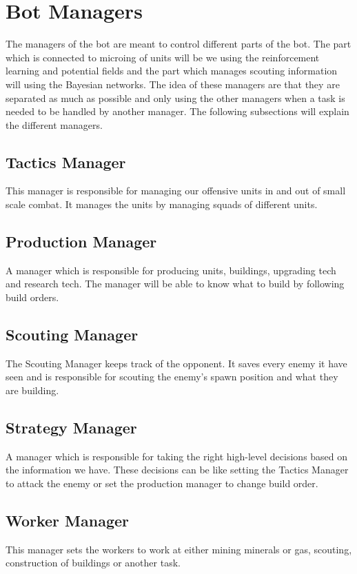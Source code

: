 \section{Bot Managers}
	\label{design::managers}
	The managers of the bot are meant to control different parts of the bot. The part which is connected to microing of units will be we using the 
	reinforcement learning and potential fields and the part which manages scouting information will using the Bayesian networks. 
	The idea of these managers are that they are separated as much as possible and only using the other managers when a task is needed to be handled 
	by another manager. The following subsections will explain the different managers.
	
	\subsection*{Tactics Manager}
		This manager is responsible for managing our offensive units in and out of small scale combat. It manages the units by managing squads of different 
		units.
	\subsection*{Production Manager}
		A manager which is responsible for producing units, buildings, upgrading tech and research tech. The manager will be able to 
		know what to build by following build orders.
	\subsection*{Scouting Manager}
		The Scouting Manager keeps track of the opponent. It saves every enemy it have seen and is responsible for scouting the enemy's spawn position and 
		what they are building.
	\subsection*{Strategy Manager}
		A manager which is responsible for taking the right high-level decisions based on the information we have. These decisions can be like 
		setting the Tactics Manager to attack the enemy or set the production manager to change build order.
	\subsection*{Worker Manager}
		This manager sets the workers to work at either mining minerals or gas, scouting, construction of buildings or another task.

